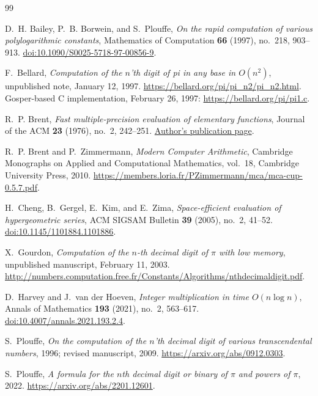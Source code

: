 \documentclass[11pt]{article}
\numberwithin{equation}{section}
\theoremstyle{definition}
\begin{document}
\begin{thebibliography}{99}
\small
\raggedright

D.~H. Bailey, P.~B. Borwein, and S.~Plouffe,
\emph{On the rapid computation of various polylogarithmic constants},
Mathematics of Computation \textbf{66} (1997), no.~218, 903--913.
\href{https://doi.org/10.1090/S0025-5718-97-00856-9}
{doi:10.1090/S0025-5718-97-00856-9}.

F.~Bellard,
\emph{Computation of the $n$'th digit of pi in any base in $O(n^2)$},
unpublished note, January 12, 1997.
\url{https://bellard.org/pi/pi_n2/pi_n2.html}.
Gosper-based C implementation, February 26, 1997:
\url{https://bellard.org/pi/pi1.c}.

R.~P. Brent,
\emph{Fast multiple-precision evaluation of elementary functions},
Journal of the ACM \textbf{23} (1976), no.~2, 242--251.
\href{https://maths-people.anu.edu.au/~brent/pub/pub034.html}
{Author's publication page}.

R.~P. Brent and P.~Zimmermann,
\emph{Modern Computer Arithmetic},
Cambridge Monographs on Applied and Computational Mathematics,
vol.~18, Cambridge University Press, 2010.
\url{https://members.loria.fr/PZimmermann/mca/mca-cup-0.5.7.pdf}.

H.~Cheng, B.~Gergel, E.~Kim, and E.~Zima,
\emph{Space-efficient evaluation of hypergeometric series},
ACM SIGSAM Bulletin \textbf{39} (2005), no.~2, 41--52.
\href{https://doi.org/10.1145/1101884.1101886}
{doi:10.1145/1101884.1101886}.

X.~Gourdon,
\emph{Computation of the $n$-th decimal digit of $\pi$ with low memory},
unpublished manuscript, February 11, 2003.
\url{http://numbers.computation.free.fr/Constants/Algorithms/nthdecimaldigit.pdf}.

D.~Harvey and J.~van der Hoeven,
\emph{Integer multiplication in time $O(n\log n)$},
Annals of Mathematics \textbf{193} (2021), no.~2, 563--617.
\href{https://doi.org/10.4007/annals.2021.193.2.4}
{doi:10.4007/annals.2021.193.2.4}.

S.~Plouffe,
\emph{On the computation of the $n$'th decimal digit of various
transcendental numbers},
1996; revised manuscript, 2009.
\url{https://arxiv.org/abs/0912.0303}.

S.~Plouffe,
\emph{A formula for the $n$th decimal digit or binary of $\pi$
and powers of $\pi$},
2022.
\url{https://arxiv.org/abs/2201.12601}.


\end{thebibliography}
\end{document}
